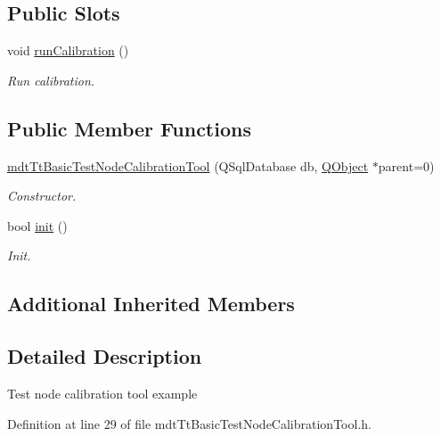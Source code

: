 \subsection*{Public Slots}
\begin{DoxyCompactItemize}
\item 
void \hyperlink{classmdt_tt_basic_test_node_calibration_tool_a0a524857582a178cbea54775cf526985}{run\-Calibration} ()
\begin{DoxyCompactList}\small\item\em Run calibration. \end{DoxyCompactList}\end{DoxyCompactItemize}
\subsection*{Public Member Functions}
\begin{DoxyCompactItemize}
\item 
\hyperlink{classmdt_tt_basic_test_node_calibration_tool_aeddd296806f3e2b7ea99ba220171a3c6}{mdt\-Tt\-Basic\-Test\-Node\-Calibration\-Tool} (Q\-Sql\-Database db, \hyperlink{class_q_object}{Q\-Object} $\ast$parent=0)
\begin{DoxyCompactList}\small\item\em Constructor. \end{DoxyCompactList}\item 
bool \hyperlink{classmdt_tt_basic_test_node_calibration_tool_af7fe717bef7b4af47ef90a2e90bfb288}{init} ()
\begin{DoxyCompactList}\small\item\em Init. \end{DoxyCompactList}\end{DoxyCompactItemize}
\subsection*{Additional Inherited Members}


\subsection{Detailed Description}
Test node calibration tool example 

Definition at line 29 of file mdt\-Tt\-Basic\-Test\-Node\-Calibration\-Tool.\-h.



